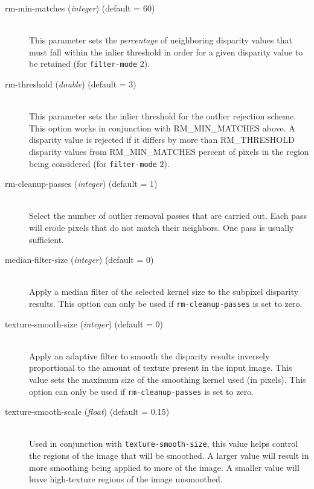 \begin{description}
\item[rm-min-matches \textnormal{\small{(\emph{integer})}} (default = 60)] \hfill \\
  This parameter sets the {\em percentage} of neighboring disparity
  values that must fall within the inlier threshold in order for a
  given disparity value to be retained (for \texttt{filter-mode} 2).

\item[rm-threshold \textnormal{\small{(\emph{double})}} (default = 3)] \hfill \\
  This parameter sets the inlier threshold for the outlier rejection
  scheme.  This option works in conjunction with RM\_MIN\_MATCHES
  above.  A disparity value is rejected if it differs by more than
  RM\_THRESHOLD disparity values from RM\_MIN\_MATCHES percent of
  pixels in the region being considered  (for \texttt{filter-mode} 2).

\item[rm-cleanup-passes \textnormal{\small{(\emph{integer})}} (default = 1)] \hfill \\
  Select the number of outlier removal passes that are carried out.
  Each pass will erode pixels that do not match their neighbors.  One
  pass is usually sufficient.

\item[median-filter-size \textnormal{\small{(\emph{integer})}} (default = 0)] \hfill \\
  Apply a median filter of the selected kernel size to the subpixel disparity results.
  This option can only be used if \texttt{rm-cleanup-passes} is set to zero.

\item[texture-smooth-size \textnormal{\small{(\emph{integer})}} (default = 0)] \hfill \\
  Apply an adaptive filter to smooth the disparity results inversely proportional to
  the amount of texture present in the input image.  This value sets the maximum size 
  of the smoothing kernel used (in pixels).
  This option can only be used if \texttt{rm-cleanup-passes} is set to zero.

\item[texture-smooth-scale \textnormal{\small{(\emph{float})}} (default = 0.15)] \hfill \\
  Used in conjunction with \texttt{texture-smooth-size}, this value helps control the 
  regions of the image that will be smoothed.  A larger value will result in more 
  smoothing being applied to more of the image.  A smaller value will leave high-texture
  regions of the image unsmoothed.


\end{description}
